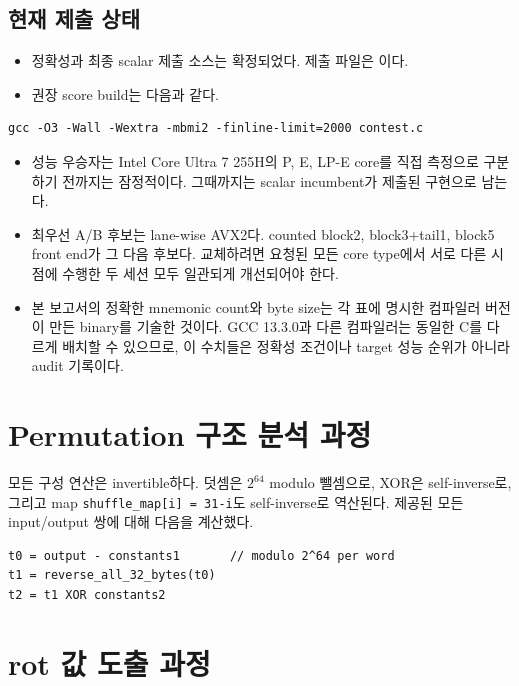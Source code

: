 \documentclass[11pt,a4paper]{article}
\begin{document}
\subsection*{현재 제출 상태}

\begin{itemize}
  \item 정확성과 최종 scalar 제출 소스는 확정되었다.  제출 파일은
        이다.
  \item 권장 score build는 다음과 같다.
\end{itemize}

\begin{lstlisting}
gcc -O3 -Wall -Wextra -mbmi2 -finline-limit=2000 contest.c
\end{lstlisting}

\begin{itemize}
  \item 성능 우승자는 Intel Core Ultra 7 255H의 P, E, LP-E core를 직접
        측정으로 구분하기 전까지는 잠정적이다.  그때까지는 scalar
        incumbent가 제출된 구현으로 남는다.
  \item 최우선 A/B 후보는 lane-wise AVX2다.  counted block2,
        block3+tail1, block5 front end가 그 다음 후보다.  교체하려면
        요청된 모든 core type에서 서로 다른 시점에 수행한 두 세션 모두
        일관되게 개선되어야 한다.
  \item 본 보고서의 정확한 mnemonic count와 byte size는 각 표에 명시한
        컴파일러 버전이 만든 binary를 기술한 것이다.  GCC 13.3.0과 다른
        컴파일러는 동일한 C를 다르게 배치할 수 있으므로, 이 수치들은
        정확성 조건이나 target 성능 순위가 아니라 audit 기록이다.
\end{itemize}

\section{Permutation 구조 분석 과정}

모든 구성 연산은 invertible하다.  덧셈은 $2^{64}$ modulo 뺄셈으로,
XOR은 self-inverse로, 그리고 map \texttt{shuffle\_map[i] = 31-i}도
self-inverse로 역산된다.  제공된 모든 input/output 쌍에 대해 다음을
계산했다.

\begin{lstlisting}
t0 = output - constants1       // modulo 2^64 per word
t1 = reverse_all_32_bytes(t0)
t2 = t1 XOR constants2
\end{lstlisting}

\section{rot 값 도출 과정}
\end{document}
